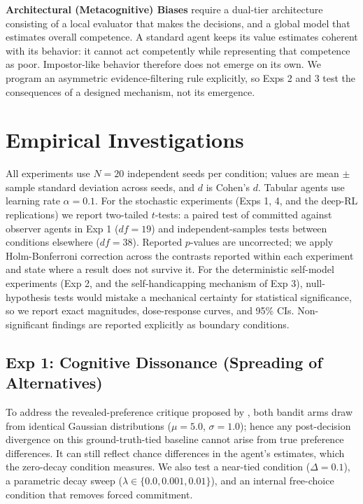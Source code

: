 \documentclass[conference]{IEEEtran}
\begin{document}
\textbf{Architectural (Metacognitive) Biases} require a dual-tier architecture consisting of a local evaluator that makes the decisions, and a global model that estimates overall competence. A standard agent keeps its value estimates coherent with its behavior: it cannot act competently while representing that competence as poor. Impostor-like behavior therefore does not emerge on its own. We program an asymmetric evidence-filtering rule explicitly, so Exps 2 and 3 test the consequences of a designed mechanism, not its emergence.

\section{Empirical Investigations}

All experiments use $N=20$ independent seeds per condition; values are mean $\pm$ sample standard deviation across seeds, and $d$ is Cohen's $d$. Tabular agents use learning rate $\alpha=0.1$. For the stochastic experiments (Exps 1, 4, and the deep-RL replications) we report two-tailed $t$-tests: a paired test of committed against observer agents in Exp 1 ($df=19$) and independent-samples tests between conditions elsewhere ($df=38$). Reported $p$-values are uncorrected; we apply Holm-Bonferroni correction across the contrasts reported within each experiment and state where a result does not survive it. For the deterministic self-model experiments (Exp 2, and the self-handicapping mechanism of Exp 3), null-hypothesis tests would mistake a mechanical certainty for statistical significance, so we report exact magnitudes, dose-response curves, and 95\% CIs. Non-significant findings are reported explicitly as boundary conditions.

\subsection{Exp 1: Cognitive Dissonance (Spreading of Alternatives)}

To address the revealed-preference critique proposed by \citet{chen2010choice}, both bandit arms draw from identical Gaussian distributions ($\mu=5.0$, $\sigma=1.0$); hence any post-decision divergence on this ground-truth-tied baseline cannot arise from true preference differences. It can still reflect chance differences in the agent's estimates, which the zero-decay condition measures. We also test a near-tied condition ($\Delta=0.1$), a parametric decay sweep ($\lambda\in\{0.0, 0.001, 0.01\}$), and an internal free-choice condition that removes forced commitment.
\end{document}
